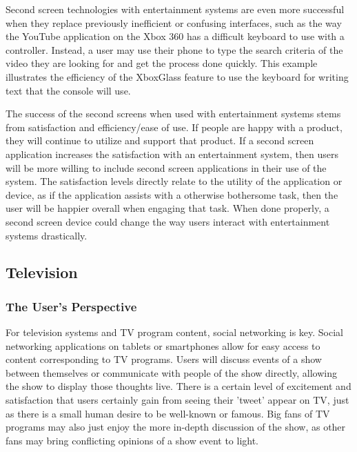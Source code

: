\documentclass[11pt, oneside]{article}
\begin{document}
Second screen technologies with entertainment systems are even more successful when they replace previously inefficient or confusing interfaces, such as the way the YouTube application on the Xbox 360 has a difficult keyboard to use with a controller. Instead, a user may use their phone to type the search criteria of the video they are looking for and get the process done quickly. This example illustrates the efficiency of the XboxGlass feature to use the keyboard for writing text that the console will use. 

The success of the second screens when used with entertainment systems stems from satisfaction and efficiency/ease of use. If people are happy with a product, they will continue to utilize and support that product. If a second screen application increases the satisfaction with an entertainment system, then users will be more willing to include second screen applications in their use of the system. The satisfaction levels directly relate to the utility of the application or device, as if the application assists with a otherwise bothersome task, then the user will be happier overall when engaging that task. When done properly, a second screen device could change the way users interact with entertainment systems drastically.

\subsection{Television}
\subsubsection{The User's Perspective}
For television systems and TV program content, social networking is key. Social networking applications on tablets or smartphones allow for easy access to content corresponding to TV programs. Users will discuss events of a show between themselves or communicate with people of the show directly, allowing the show to display those thoughts live. There is a certain level of excitement and satisfaction that users certainly gain from seeing their 'tweet' appear on TV, just as there is a small human desire to be well-known or famous. Big fans of TV programs may also just enjoy the more in-depth discussion of the show, as other fans may bring conflicting opinions of a show event to light.
\end{document}
